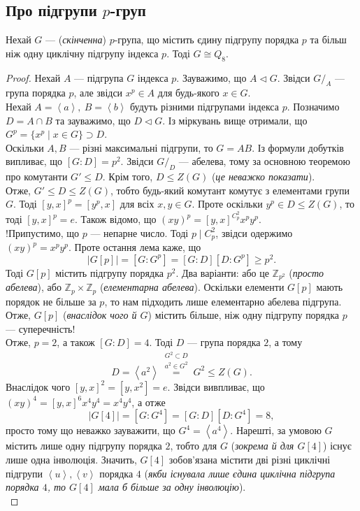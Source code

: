 \documentclass{math_library}
\begin{document}
\subsection{Про підгрупи $p$-груп}
\begin{theorem}
Нехай $G$ --- (\textit{скінченна}) $p$-група, що містить єдину підгрупу порядка $p$ та більш ніж одну циклічну підгрупу індекса $p$. Тоді $G \cong Q_8$.
\end{theorem}

\begin{proof}
Нехай $A$ --- підгрупа $G$ індекса $p$. Зауважимо, що $A \triangleleft G$. Звідси $G/_A$ --- група порядка $p$, але звідси $x^p \in A$ для будь-якого $x \in G$.\\
Нехай $A = \left<a\right>,\ B = \left<b\right>$ будуть різними підгрупами індекса $p$. Позначимо $D = A \cap B$ та зауважимо, що $D \triangleleft G$. Із міркувань вище отримали, що $G^p = \{x^p \mid x \in G \} \supset D$.\\
Оскільки $A,B$ --- різні максимальні підгрупи, то $G = AB$. Із формули добутків випливає, що $[G:D] = p^2$. Звідси $G/_D$ --- абелева, тому за основною теоремою про комутанти $G' \leq D$. Крім того, $D \leq Z(G)$ (\textit{це неважко показати}).\\
Отже, $G' \leq D \leq Z(G)$, тобто будь-який комутант комутує з елементами групи $G$. Тоді $[y,x]^p = [y^p,x]$ для всіх $x,y \in G$. Проте оскільки $y^p \in D \leq Z(G)$, то тоді $[y,x]^p = e$. Також відомо, що $(xy)^p = [y,x]^{C_p^2} x^py^p$.\\
!Припустимо, що $p$ --- непарне число. Тоді $p \mid C_p^2$, звідси одержимо $(xy)^p = x^py^p$. Проте остання лема каже, що
\[
|G[p]| = [G:G^p] = [G:D] [D:G^p] \geq p^2.
\]
Тоді $G[p]$ містить підгрупу порядка $p^2$. Два варіанти: або це $\mathbb{Z}_{p^2}$ (\textit{просто абелева}), або $\mathbb{Z}_p \times \mathbb{Z}_p$ (\textit{елементарна абелева}). Оскільки елементи $G[p]$ мають порядок не більше за $p$, то нам підходить лише елементарно абелева підгрупа. Отже, $G[p]$ (\textit{внаслідок чого й $G$}) містить більше, ніж одну підгрупу порядка $p$ --- суперечність!
\bigskip \\
Отже, $p = 2$, а також $[G:D] = 4$. Тоді $D$ --- група порядка $2$, а тому
\[
D = \left<a^2\right> \overset{\substack{G^2 \subset D \\ a^2 \in G^2}}{=} G^2 \leq Z(G).
\]
Внаслідок чого $[y,x]^2 = [y,x^2] = e$. Звідси вивпливає, що $(xy)^4 = [y,x]^6 x^4 y^4 = x^4 y^4$, а отже
\[
|G[4]| = [G:G^4] = [G:D] [D:G^4] = 8,
\]
просто тому що неважко зауважити, що $G^4 = \left<a^4\right>$. Нарешті, за умовою $G$ містить лише одну підгрупу порядка $2$, тобто для $G$ (\textit{зокрема й для $G[4]$}) існує лише одна інволюція. Значить, $G[4]$ зобов'язана містити дві різні циклічні підгрупи $\left<u\right>, \left<v\right>$ порядка $4$ (\textit{якби існувала лише єдина циклічна підгрупа порядка $4$, то $G[4]$ мала б більше за одну інволюцію}).\\

\end{proof}
\end{document}
